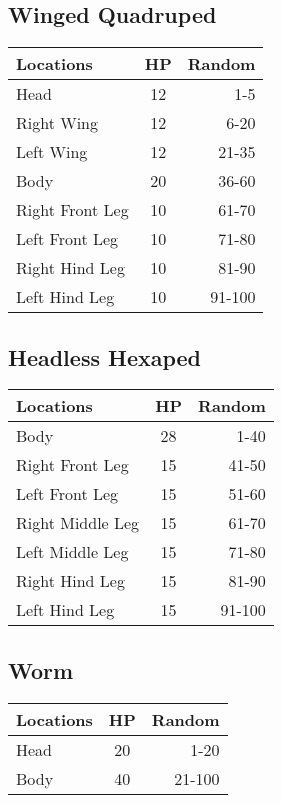 \begin{multicols}{2}
\subsection{Winged Quadruped}
\begin{minipage}{\columnwidth}
	\begin{tabularx}{\columnwidth}{|X|c|r|}
		\hline
		Locations       & HP & Random \\ \hline
		Head            & 12 &    1-5 \\ \hline
		Right Wing      & 12 &   6-20 \\ \hline
		Left Wing       & 12 &  21-35 \\ \hline
		Body            & 20 &  36-60 \\ \hline
		Right Front Leg & 10 &  61-70 \\ \hline
		Left Front Leg  & 10 &  71-80 \\ \hline
		Right Hind Leg  & 10 &  81-90 \\ \hline
		Left Hind Leg   & 10 & 91-100 \\ \hline
	\end{tabularx}
\end{minipage}

\subsection{Headless Hexaped}
\begin{minipage}{\columnwidth}
	\begin{tabularx}{\columnwidth}{|X|c|r|}
		\hline
		Locations        & HP & Random \\ \hline
		Body             & 28 &   1-40 \\ \hline
		Right Front Leg  & 15 &  41-50 \\ \hline
		Left Front Leg   & 15 &  51-60 \\ \hline
		Right Middle Leg & 15 &  61-70 \\ \hline
		Left Middle Leg  & 15 &  71-80 \\ \hline
		Right Hind Leg   & 15 &  81-90 \\ \hline
		Left Hind Leg    & 15 & 91-100 \\ \hline
	\end{tabularx}
\end{minipage}

\subsection{Worm}
\begin{minipage}{\columnwidth}
	\begin{tabularx}{\columnwidth}{|X|c|r|}
		\hline
		Locations & HP & Random \\ \hline
		Head      & 20 &   1-20 \\ \hline
		Body      & 40 & 21-100 \\ \hline
	\end{tabularx}
\end{minipage}


\end{multicols}
